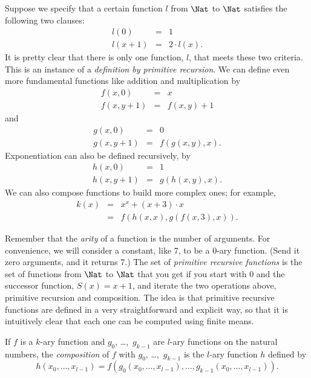 \documentclass[../../include/open-logic-section]{subfiles}
\begin{document}

\begin{explain}
Suppose we specify that a certain function $l$ from $\Nat$ to $\Nat$
satisfies the following two clauses:
\begin{eqnarray*}
l(0) & = & 1 \\
l(x+1) & = & 2 \cdot l(x).
\end{eqnarray*}
It is pretty clear that there is only one function, $l$, that meets
these two criteria. This is an instance of a \emph{definition by
  primitive recursion}. We can define even more fundamental functions
like addition and multiplication by
\begin{eqnarray*}
f(x,0) & = & x \\
f(x,y+1) & = & f(x,y)+1
\end{eqnarray*}
and
\begin{eqnarray*}
g(x,0) & = & 0 \\
g(x,y+1) & = & f(g(x,y),x).
\end{eqnarray*}
Exponentiation can also be defined recursively, by
\begin{eqnarray*}
h(x,0) & = & 1 \\
h(x,y+1) & = & g(h(x,y),x).
\end{eqnarray*}
We can also compose functions to build more complex ones; for example,
\begin{eqnarray*}
k(x) & = & x^x + (x + 3) \cdot x \\
& = & f(h(x,x),g(f(x,3),x)).
\end{eqnarray*}

Remember that the \emph{arity} of a function is the number of
arguments. For convenience, we will consider a constant, like 7, to be
a 0-ary function. (Send it zero arguments, and it returns 7.)  The set
of \emph{primitive recursive functions} is the set of functions from
$\Nat$ to $\Nat$ that you get if you start with $0$ and the successor
function, $S(x) = x+1$, and iterate the two operations above,
primitive recursion and composition. The idea is that primitive
recursive functions are defined in a very straightforward and explicit
way, so that it is intuitively clear that each one can be computed
using finite means.
\end{explain}

\begin{defn}
If $f$ is a $k$-ary function and $g_0$, \dots,~$g_{k-1}$ are $l$-ary
functions on the natural numbers, the \emph{composition} of $f$ with
$g_0$, \dots,~$g_{k-1}$ is the $l$-ary function $h$ defined by
\[
h(x_0,\dots,x_{l-1}) =
f(g_0(x_0,\dots,x_{l-1}),\dots,g_{k-1}(x_0,\dots,x_{l-1})) .
\]
\end{defn}
\end{document}
